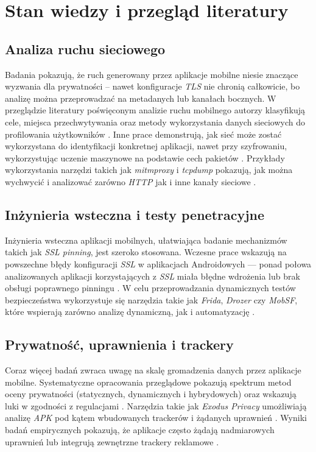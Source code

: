 \chapter{Stan wiedzy i przegląd literatury}

\section{Analiza ruchu sieciowego}
Badania pokazują, że ruch generowany przez aplikacje mobilne niesie znaczące wyzwania dla prywatności – nawet konfiguracje \emph{TLS} nie chronią całkowicie, bo analizę można przeprowadzać na metadanych lub kanałach bocznych. W przeglądzie literatury poświęconym analizie ruchu mobilnego autorzy klasyfikują cele, miejsca przechwytywania oraz metody wykorzystania danych sieciowych do profilowania użytkowników \cite{Conti2017TrafficAnalysis}. Inne prace demonstrują, jak sieć może zostać wykorzystana do identyfikacji konkretnej aplikacji, nawet przy szyfrowaniu, wykorzystując uczenie maszynowe na podstawie cech pakietów \cite{Taylor2017AppFingerprinting}. Przykłady wykorzystania narzędzi takich jak \textit{mitmproxy} i \textit{tcpdump} pokazują, jak można wychwycić i analizować zarówno \emph{HTTP} jak i inne kanały sieciowe \cite{mitmproxy,tcpdump}.

\section{Inżynieria wsteczna i testy penetracyjne}
Inżynieria wsteczna aplikacji mobilnych, ułatwiająca badanie mechanizmów takich jak \emph{SSL pinning}, jest szeroko stosowana. Wczesne prace wskazują na powszechne błędy konfiguracji \emph{SSL} w aplikacjach Androidowych — ponad połowa analizowanych aplikacji korzystających z \emph{SSL} miała błędne wdrożenia lub brak obsługi poprawnego pinningu \cite{Fahl2012WhyEve}. W celu przeprowadzania dynamicznych testów bezpieczeństwa wykorzystuje się narzędzia takie jak \textit{Frida}, \textit{Drozer} czy \textit{MobSF}, które wspierają zarówno analizę dynamiczną, jak i automatyzację \cite{MobSF,Frida}.

\section{Prywatność, uprawnienia i trackery}
Coraz więcej badań zwraca uwagę na skalę gromadzenia danych przez aplikacje mobilne. Systematyczne opracowania przeglądowe pokazują spektrum metod oceny prywatności (statycznych, dynamicznych i hybrydowych) oraz wskazują luki w zgodności z regulacjami \cite{DelAlamo2021PrivacyMapping}. Narzędzia takie jak \textit{Exodus Privacy} umożliwiają analizę \emph{APK} pod kątem wbudowanych trackerów i żądanych uprawnień \cite{ExodusPrivacy}. Wyniki badań empirycznych pokazują, że aplikacje często żądają nadmiarowych uprawnień lub integrują zewnętrzne trackery reklamowe \cite{Razaghpanah2018AppsPrivacy}.

